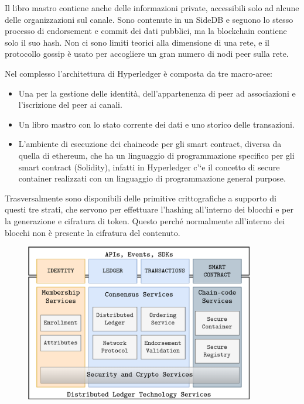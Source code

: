 Il libro mastro contiene anche delle informazioni private, accessibili solo ad alcune delle organizzazioni sul canale. Sono contenute in un SideDB e seguono lo stesso processo di endorsement e commit dei dati pubblici, ma la blockchain contiene solo il suo hash. Non ci sono limiti teorici alla dimensione di una rete, e il protocollo gossip è usato per accogliere un gran numero di nodi peer sulla rete.

\vspace{5mm}
 
Nel complesso l'architettura di Hyperledger è composta da tre macro-aree: 
\begin{itemize}
    \item Una per la gestione delle identità, dell'appartenenza di peer ad associazioni e l'iscrizione del peer ai canali.
    \item Un libro mastro con lo stato corrente dei dati e uno storico delle transazioni.
    \item L'ambiente di esecuzione dei chaincode per gli smart contract, diversa da quella di ethereum, che ha un linguaggio di programmazione specifico per gli smart contract (Solidity), infatti in Hyperledger c'`e il concetto di secure container realizzati con un linguaggio di programmazione general purpose.
\end{itemize}
Trasversalmente sono disponibili delle primitive crittografiche a supporto di questi tre strati, che servono per effettuare l'hashing all'interno dei blocchi e per la generazione  e cifratura di token. Questo perché normalmente all'interno dei blocchi non è presente la cifratura del contenuto.

\begin{figure}[htb!]
    \centering
    \includegraphics[width=10cm]{./Images/cap3/3.16.png}
\end{figure}


